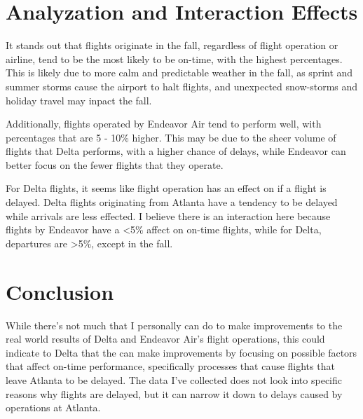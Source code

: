 \documentclass{article}
\begin{document}
  \section{Analyzation and Interaction Effects}

  It stands out that flights originate in the fall, regardless of flight
  operation or airline, tend to be the most likely to be on-time, with the
  highest percentages. This is likely due to more calm and predictable weather
  in the fall, as sprint and summer storms cause the airport to halt flights,
  and unexpected snow-storms and holiday travel may inpact the fall.
  
  Additionally, flights operated by Endeavor Air tend to perform well, with 
  percentages that are 5 - 10\% higher. This may be due to the sheer volume of
  flights that Delta performs, with a higher chance of delays, while Endeavor
  can better focus on the fewer flights that they operate.

  For Delta flights, it seems like flight operation has an effect on if a 
  flight is delayed. Delta flights originating from Atlanta have a tendency to
  be delayed while arrivals are less effected. I believe there is an 
  interaction here because flights by Endeavor have a \textless 5\% affect on 
  on-time flights, while for Delta, departures are \textgreater 5\%, except in the fall.

  \section{Conclusion}

  While there's not much that I personally can do to make improvements to the
  real world results of Delta and Endeavor Air's flight operations, this could
  indicate to Delta that the can make improvements by focusing on possible
  factors that affect on-time performance, specifically processes that cause
  flights that leave Atlanta to be delayed. The data I've collected does not
  look into specific reasons why flights are delayed, but it can narrow it down
  to delays caused by operations at Atlanta.
\end{document}

